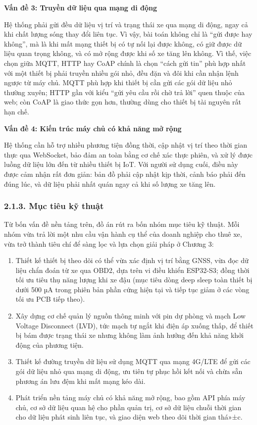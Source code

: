 \documentclass[a4paper]{extarticle}
\providecommand{\tightlist}{%
  \setlength{\itemsep}{0pt}\setlength{\parskip}{0pt}}
\begin{document}
\textbf{Vấn đề 3: Truyền dữ liệu qua mạng di động}

Hệ thống phải gửi đều dữ liệu vị trí và trạng thái xe qua mạng di động,
ngay cả khi chất lượng sóng thay đổi liên tục. Vì vậy, bài toán không
chỉ là ``gửi được hay không'', mà là khi mất mạng thiết bị có tự nối lại
được không, có giữ được dữ liệu quan trọng không, và có mở rộng được khi
số xe tăng lên không. Vì thế, việc chọn giữa MQTT, HTTP hay CoAP chính
là chọn ``cách gửi tin'' phù hợp nhất với một thiết bị phải truyền nhiều
gói nhỏ, đều đặn và đôi khi cần nhận lệnh ngược từ máy chủ. MQTT
phù hợp khi thiết bị cần gửi các gói dữ liệu nhỏ thường xuyên; HTTP gần với kiểu
``gửi yêu cầu rồi chờ trả lời'' quen thuộc của web; còn CoAP là giao thức
gọn hơn, thường dùng cho thiết bị tài nguyên rất hạn chế.

\textbf{Vấn đề 4: Kiến trúc máy chủ có khả năng mở rộng}

Hệ thống cần hỗ trợ nhiều phương tiện đồng thời, cập nhật vị trí theo
thời gian thực qua WebSocket, bảo đảm an toàn bằng cơ chế xác thực
phiên, và xử lý được luồng dữ liệu lớn đến từ nhiều thiết bị IoT. Với
người sử dụng cuối, điều này được cảm nhận rất đơn giản: bản đồ phải cập
nhật kịp thời, cảnh báo phải đến đúng lúc, và dữ liệu phải nhất quán
ngay cả khi số lượng xe tăng lên.

\subsubsection{2.1.3. Mục tiêu kỹ
thuật}\label{213-mux1ee5c-tiuxeau-kux1ef9-thuux1eadt}

Từ bốn vấn đề nền tảng trên, đồ án rút ra bốn nhóm mục tiêu kỹ thuật.
Mỗi nhóm vừa trả lời một nhu cầu vận hành cụ thể của doanh nghiệp cho
thuê xe, vừa trở thành tiêu chí để sàng lọc và lựa chọn giải pháp ở
Chương 3:

\begin{enumerate}
\def\labelenumi{\arabic{enumi}.}
\tightlist
\item
  Thiết kế thiết bị theo dõi có thể vừa xác định vị trí bằng GNSS, vừa
  đọc dữ liệu chẩn đoán từ xe qua OBD2, dựa trên vi điều khiển ESP32-S3;
  đồng thời tối ưu tiêu thụ năng lượng khi xe đậu (mục tiêu dòng deep
  sleep toàn thiết bị dưới 500 µA trong phiên bản phần cứng hiện tại và
  tiếp tục giảm ở các vòng tối ưu PCB tiếp theo).
\item
  Xây dựng cơ chế quản lý nguồn thông minh với pin dự phòng và mạch Low
  Voltage Disconnect (LVD), tức mạch tự ngắt khi điện áp xuống thấp, để
  thiết bị bám được trạng thái xe nhưng không làm ảnh hưởng đến khả năng
  khởi động của phương tiện.
\item
  Thiết kế đường truyền dữ liệu sử dụng MQTT qua mạng 4G/LTE để gửi các
  gói dữ liệu nhỏ qua mạng di động, ưu tiên tự phục hồi kết nối và chừa sẵn
  phương án lưu đệm khi mất mạng kéo dài.
\item
  Phát triển nền tảng máy chủ có khả năng mở rộng, bao gồm API phía máy
  chủ, cơ sở dữ liệu quan hệ cho phần quản trị, cơ sở dữ liệu chuỗi thời
  gian cho dữ liệu phát sinh liên tục, và giao diện web theo dõi thời
  gian thá»±c.
\end{enumerate}
\end{document}
